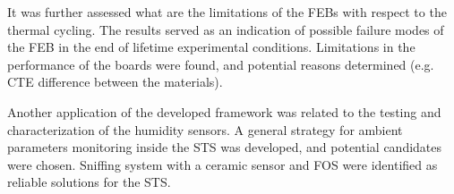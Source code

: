 It was further assessed what are the limitations of the \glspl{FEB} with respect to the thermal cycling. The results served as an indication of possible failure modes of the \gls{FEB} in the end of lifetime  experimental conditions. Limitations in the performance of the boards were found, and potential reasons determined (e.g. \gls{CTE} difference between the materials). 

Another application of the developed framework was related to the testing and characterization of the humidity sensors. A general strategy for ambient parameters monitoring inside the \gls{STS} was developed, and potential candidates were chosen. Sniffing system with a ceramic sensor and \gls{FOS} were identified as reliable solutions for the \gls{STS}. 